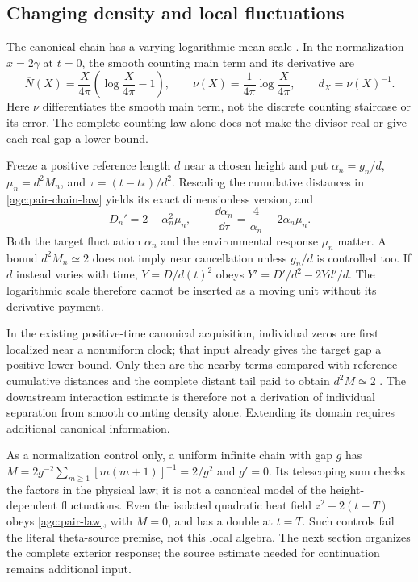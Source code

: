 \subsection{Changing density and local fluctuations}

The canonical chain has a varying logarithmic mean scale
\cite{VCDCMDiscussion09,VCDCMDiscussion10}. In the normalization
$x=2\gamma$ at $t=0$, the smooth counting main term and its derivative are
\begin{equation}
 \overline N(X)=\frac{X}{4\pi}\left(\log\frac{X}{4\pi}-1\right),
 \qquad \nu(X)=\frac1{4\pi}\log\frac{X}{4\pi},\qquad
 d_X=\nu(X)^{-1}.
 \label{agc:pair-density}
\end{equation}
Here $\nu$ differentiates the smooth main term, not the discrete
counting staircase or its error. The complete counting law alone
does not make the divisor real or give each real gap a lower bound.

Freeze a positive reference length $d$ near a chosen height and put
$\alpha_n=g_n/d$, $\mu_n=d^2M_n$, and
$\tau=(t-t_*)/d^2$. Rescaling the cumulative distances in
\eqref{agc:pair-chain-law} yields its exact dimensionless version, and
\begin{equation}
 D_n'=2-\alpha_n^2\mu_n,\qquad
 \frac{\dd\alpha_n}{\dd\tau}=\frac4{\alpha_n}-2\alpha_n\mu_n.
 \label{agc:pair-unfolded}
\end{equation}
Both the target fluctuation $\alpha_n$ and the environmental response
$\mu_n$ matter. A bound $d^2M_n\simeq2$ does not imply near cancellation
unless $g_n/d$ is controlled too. If $d$ instead varies with time,
$Y=D/d(t)^2$ obeys $Y'=D'/d^2-2Yd'/d$.
The logarithmic scale therefore cannot be inserted as a moving unit
without its derivative payment.

In the existing positive-time canonical acquisition, individual zeros
are first localized near a nonuniform clock; that input already gives
the target gap a positive lower bound. Only then are the nearby terms
compared with reference cumulative distances and the complete distant
tail paid to obtain $d^2M\simeq2$ \cite{VCDCMDiscussion10}.
The downstream interaction estimate is therefore not a derivation of
individual separation from smooth counting density alone. Extending
its domain requires additional canonical information.

As a normalization control only, a uniform infinite chain with gap $g$
has $M=2g^{-2}\sum_{m\ge1}[m(m+1)]^{-1}=2/g^2$ and $g'=0$.
Its telescoping sum checks the factors in the physical law; it is not
a canonical model of the height-dependent fluctuations.
Even the isolated quadratic heat field $z^2-2(t-T)$ obeys
\eqref{agc:pair-law}, with $M=0$, and has a double at $t=T$.
Such controls fail the literal theta-source premise, not this local
algebra. The next section organizes the complete exterior response;
the source estimate needed for continuation remains additional input.
